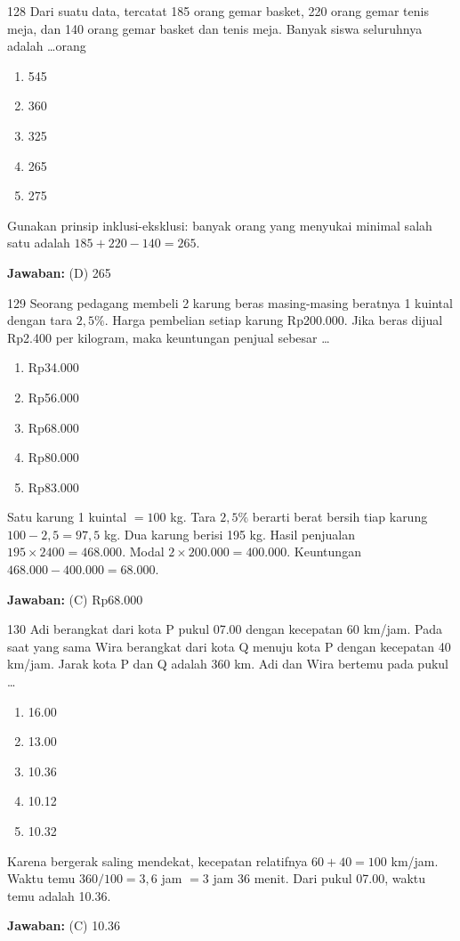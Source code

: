\documentclass[11pt]{article}
\newenvironment{pil}{\begin{enumerate}[label=(\Alph*),leftmargin=*,itemsep=1pt,topsep=3pt]}{\end{enumerate}}
\newcommand{\jw}[1]{\par\smallskip\begin{jawbox}\textbf{Jawaban:} #1\end{jawbox}}
\begin{document}
\begin{soalbox}{1}{28}
Dari suatu data, tercatat 185 orang gemar basket, 220 orang gemar tenis meja, dan 140 orang gemar basket dan tenis meja. Banyak siswa seluruhnya adalah \ldots orang
\begin{pil}\item 545 \item 360 \item 325 \item 265 \item 275\end{pil}
\end{soalbox}
\begin{pembox}
Gunakan prinsip inklusi-eksklusi: banyak orang yang menyukai minimal salah satu adalah $185+220-140=265$.
\jw{(D) 265}
\end{pembox}

\begin{soalbox}{1}{29}
Seorang pedagang membeli 2 karung beras masing-masing beratnya 1 kuintal dengan tara $2{,}5\%$. Harga pembelian setiap karung Rp200.000. Jika beras dijual Rp2.400 per kilogram, maka keuntungan penjual sebesar \ldots
\begin{pil}\item Rp34.000 \item Rp56.000 \item Rp68.000 \item Rp80.000 \item Rp83.000\end{pil}
\end{soalbox}
\begin{pembox}
Satu karung 1 kuintal $=100$ kg. Tara $2{,}5\%$ berarti berat bersih tiap karung $100-2{,}5=97{,}5$ kg. Dua karung berisi 195 kg. Hasil penjualan $195\times2400=468.000$. Modal $2\times200.000=400.000$. Keuntungan $468.000-400.000=68.000$.
\jw{(C) Rp68.000}
\end{pembox}

\begin{soalbox}{1}{30}
Adi berangkat dari kota P pukul 07.00 dengan kecepatan 60 km/jam. Pada saat yang sama Wira berangkat dari kota Q menuju kota P dengan kecepatan 40 km/jam. Jarak kota P dan Q adalah 360 km. Adi dan Wira bertemu pada pukul \ldots
\begin{pil}\item 16.00 \item 13.00 \item 10.36 \item 10.12 \item 10.32\end{pil}
\end{soalbox}
\begin{pembox}
Karena bergerak saling mendekat, kecepatan relatifnya $60+40=100$ km/jam. Waktu temu $360/100=3{,}6$ jam $=3$ jam 36 menit. Dari pukul 07.00, waktu temu adalah 10.36.
\jw{(C) 10.36}
\end{pembox}
\end{document}
